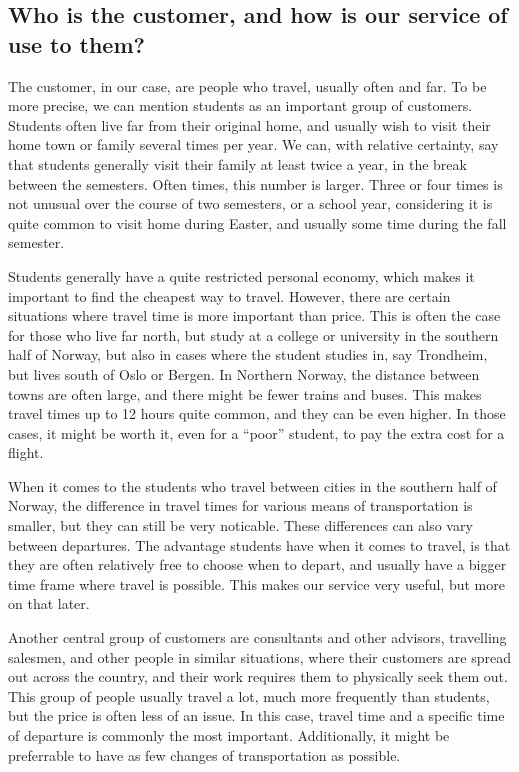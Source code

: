 \subsection{Who is the customer, and how is our service of use to them?}

The customer, in our case, are people who travel, usually often and far. To be more precise, we can mention students as an important group of customers. Students often live far from their original home, and usually wish to visit their home town or family several times per year. We can, with relative certainty, say that students generally visit their family at least twice a year, in the break between the semesters. Often times, this number is larger. Three or four times is not unusual over the course of two semesters, or a school year, considering it is quite common to visit home during Easter, and usually some time during the fall semester.

Students generally have a quite restricted personal economy, which makes it important to find the cheapest way to travel. However, there are certain situations where travel time is more important than price. This is often the case for those who live far north, but study at a college or university in the southern half of Norway, but also in cases where the student studies in, say Trondheim, but lives south of Oslo or Bergen. In Northern Norway, the distance between towns are often large, and there might be fewer trains and buses. This makes travel times up to 12 hours quite common, and they can be even higher. In those cases, it might be worth it, even for a ``poor'' student, to pay the extra cost for a flight.

When it comes to the students who travel between cities in the southern half of Norway, the difference in travel times for various means of transportation is smaller, but they can still be very noticable. These differences can also vary between departures. The advantage students have when it comes to travel, is that they are often relatively free to choose when to depart, and usually have a bigger time frame where travel is possible. This makes our service very useful, but more on that later.

Another central group of customers are consultants and other advisors, travelling salesmen, and other people in similar situations, where their customers are spread out across the country, and their work requires them to physically seek them out. This group of people usually travel a lot, much more frequently than students, but the price is often less of an issue. In this case, travel time and a specific time of departure is commonly the most important. Additionally, it might be preferrable to have as few changes of transportation as possible.

